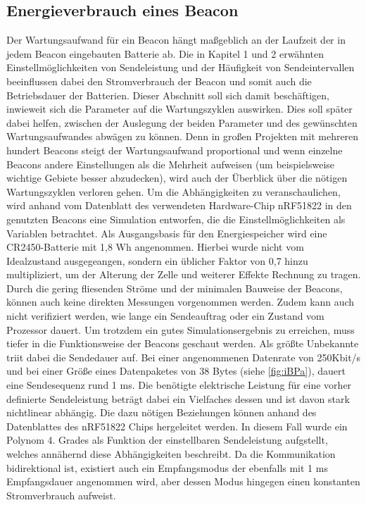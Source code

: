 \subsection{Energieverbrauch eines Beacon} 
Der Wartungsaufwand für ein Beacon hängt maßgeblich an der Laufzeit der in jedem Beacon eingebauten Batterie ab. Die in Kapitel 1 und 2 erwähnten Einstellmöglichkeiten von Sendeleistung und der Häufigkeit von Sendeintervallen beeinflussen dabei den Stromverbrauch der Beacon und somit auch die Betriebsdauer der Batterien. Dieser Abschnitt soll sich damit beschäftigen, inwieweit sich die Parameter auf die Wartungszyklen auswirken. Dies soll später dabei helfen, zwischen der Auslegung der beiden Parameter und des gewünschten Wartungsaufwandes abwägen zu können. Denn in großen Projekten mit mehreren hundert Beacons steigt der Wartungsaufwand proportional und wenn einzelne Beacons andere Einstellungen als die Mehrheit aufweisen (um beispielsweise wichtige Gebiete besser abzudecken), wird auch der Überblick über die nötigen Wartungszyklen verloren gehen. Um die Abhängigkeiten zu veranschaulichen, wird anhand vom Datenblatt des verwendeten Hardware-Chip nRF51822\cite{nRF5} in den genutzten Beacons eine Simulation entworfen, die die Einstellmöglichkeiten als Variablen betrachtet. Als Ausgangsbasis für den Energiespeicher wird eine CR2450-Batterie mit 1,8 Wh\cite{CR2450} angenommen. Hierbei wurde nicht vom Idealzustand ausgegeangen, sondern ein üblicher Faktor von 0,7 hinzu multipliziert, um der Alterung der Zelle und weiterer Effekte Rechnung zu tragen. Durch die gering fliesenden Ströme und der minimalen Bauweise der Beacons, können auch keine direkten Messungen vorgenommen werden. Zudem kann auch nicht verifiziert werden, wie lange ein Sendeauftrag oder ein Zustand vom Prozessor dauert. Um trotzdem ein gutes Simulationsergebnis zu erreichen, muss tiefer in die Funktionsweise der Beacons geschaut werden. Als größte Unbekannte triit dabei die Sendedauer auf. Bei einer angenommenen Datenrate von 250Kbit/s  und bei einer Größe eines Datenpaketes von 38 Bytes \cite{iBPa} (siehe \ref{fig:iBPa}), dauert eine Sendesequenz rund 1 ms. Die benötigte elektrische Leistung für eine vorher definierte Sendeleistung beträgt dabei ein Vielfaches dessen und ist davon stark nichtlinear abhängig. Die dazu nötigen Beziehungen können anhand des Datenblattes des nRF51822 Chips hergeleitet werden. In diesem Fall wurde ein Polynom 4. Grades als Funktion der einstellbaren Sendeleistung aufgstellt, welches annähernd diese Abhängigkeiten beschreibt. Da die Kommunikation bidirektional ist, existiert auch ein Empfangsmodus der ebenfalls mit 1 ms Empfangsdauer angenommen wird, aber dessen Modus hingegen einen konstanten Stromverbrauch aufweist.

